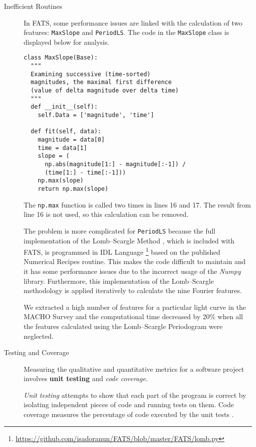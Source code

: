 \documentclass[final,5p,times,twocolumn,authoryear]{elsarticle}
\begin{document}
\begin{description}
\item [Inefficient Routines]
%
In FATS, some performance issues are linked with the calculation of two features:
\texttt{MaxSlope} and \texttt{PeriodLS}. 
The code in the \texttt{MaxSlope} class is displayed below for analysis.

\begin{verbatim}
class MaxSlope(Base):
  """
  Examining successive (time-sorted) 
  magnitudes, the maximal first difference
  (value of delta magnitude over delta time)
  """
  def __init__(self):
    self.Data = ['magnitude', 'time']

  def fit(self, data):
    magnitude = data[0]
    time = data[1]
    slope = (
      np.abs(magnitude[1:] - magnitude[:-1]) / 
      (time[1:] - time[:-1]))
    np.max(slope)
    return np.max(slope)
\end{verbatim}
%
The \texttt{np.max} function is called two times in lines 16 and 17. 
The result from line 16 is not used, so this calculation can be removed.

The problem is more complicated for \texttt{PeriodLS} because the full 
implementation of the Lomb--Scargle Method \citep{vanderplas2018understanding}, 
which is included with FATS, is programmed in IDL Language \citep{landsman_idl_1995}
\footnote{\url{https://github.com/isadoranun/FATS/blob/master/FATS/lomb.py}} 
based on the published Numerical Recipes \citep{press_numerical_2007} routine.
%
This makes the code difficult to maintain and it has some performance issues 
due to the incorrect usage of the \textit{Numpy} library.  
%
Furthermore, this implementation of the Lomb--Scargle methodology is applied 
iteratively to calculate the nine Fourier features.

We extracted a high number of features for a particular light curve in the MACHO Survey 
and the computational time decreased by 20\% 
when all the features calculated using the Lomb--Scargle Periodogram
were neglected. 

\item [Testing and Coverage]
%
Measuring the qualitative and quantitative metrics for a software project involves
\textbf{unit testing} and \textit{code coverage}.

\textit{Unit testing} attempts to show that each part of the program is correct 
\citep{jazayeri_trends_2007} by isolating independent pieces of code and running tests on them.
Code coverage measures the percentage of code executed by the unit tests \citep{miller_systematic_1963}.


\end{description}
\end{document}

